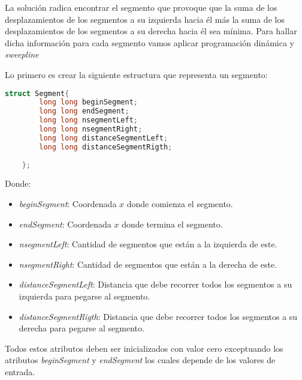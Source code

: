 La solución radica encontrar el segmento que provoque que la suma de los desplazamientos de los segmentos a su izquierda hacia él más la suma de los desplazamientos de los segmentos a su derecha hacia él sea mínima. Para hallar dicha información para cada segmento vamos aplicar programación dinámica y \emph{sweepline} 

Lo primero es crear la siguiente estructura que representa un segmento:

\begin{lstlisting}[language=C++]
	struct Segment{
		long long beginSegment;
		long long endSegment;
		long long nsegmentLeft;
		long long nsegmentRight;
		long long distanceSegmentLeft;
		long long distanceSegmentRigth;
		
	};
\end{lstlisting}

Donde:

\begin{itemize}
	\item \emph{beginSegment}: Coordenada $x$ donde comienza el segmento.
	\item \emph{endSegment}: Coordenada $x$ donde termina el segmento.
	\item \emph{nsegmentLeft}: Cantidad de segmentos que están a la izquierda de este.
	\item \emph{nsegmentRight}: Cantidad de segmentos que están a la derecha de este.
	\item \emph{distanceSegmentLeft}: Distancia que debe recorrer todos los segmentos a su izquierda para pegarse al segmento.
	\item \emph{distanceSegmentRigth}: Distancia que debe recorrer todos los segmentos a su derecha para pegarse al segmento.
\end{itemize}

Todos estos atributos deben ser inicializados con valor cero exceptuando los atributos \emph{beginSegment} y \emph{endSegment} los cuales depende de los valores de entrada.

